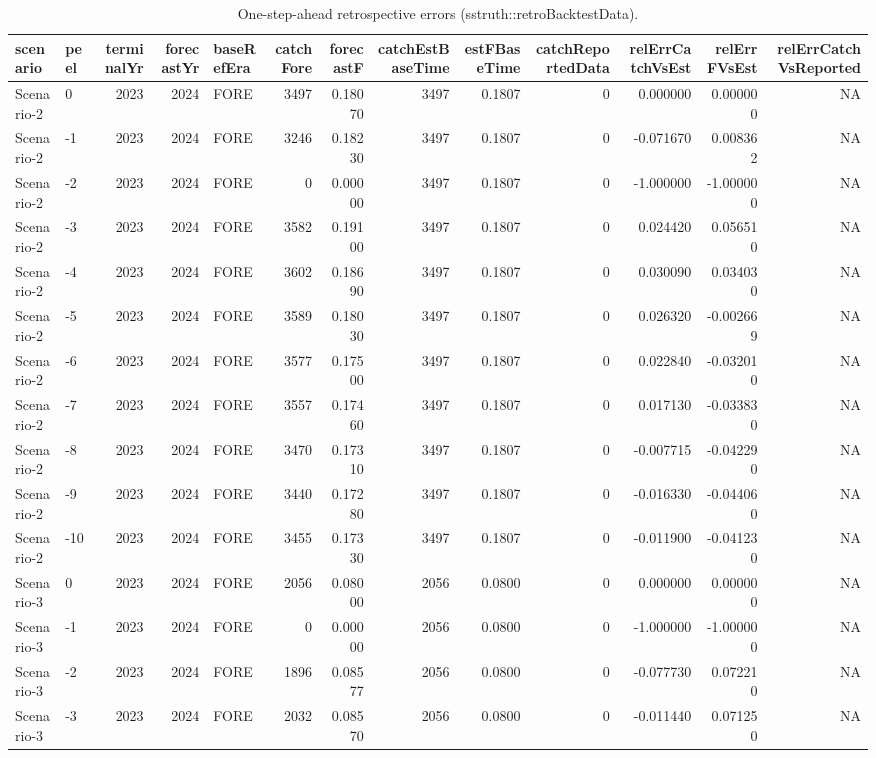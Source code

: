 \begin{table}

\caption{\label{tab:robustness-retro-onestep}One-step-ahead retrospective errors (sstruth::retroBacktestData).}
\centering
\begin{tabular}[t]{llrrlrrrrrrrr}
\toprule
scenario & peel & terminalYr & forecastYr & baseRefEra & catchFore & forecastF & catchEstBaseTime & estFBaseTime & catchReportedData & relErrCatchVsEst & relErrFVsEst & relErrCatchVsReported\\
\midrule
Scenario-2 & 0 & 2023 & 2024 & FORE & 3497 & 0.18070 & 3497 & 0.1807 & 0 & 0.000000 & 0.000000 & NA\\
Scenario-2 & -1 & 2023 & 2024 & FORE & 3246 & 0.18230 & 3497 & 0.1807 & 0 & -0.071670 & 0.008362 & NA\\
Scenario-2 & -2 & 2023 & 2024 & FORE & 0 & 0.00000 & 3497 & 0.1807 & 0 & -1.000000 & -1.000000 & NA\\
Scenario-2 & -3 & 2023 & 2024 & FORE & 3582 & 0.19100 & 3497 & 0.1807 & 0 & 0.024420 & 0.056510 & NA\\
Scenario-2 & -4 & 2023 & 2024 & FORE & 3602 & 0.18690 & 3497 & 0.1807 & 0 & 0.030090 & 0.034030 & NA\\
\addlinespace
Scenario-2 & -5 & 2023 & 2024 & FORE & 3589 & 0.18030 & 3497 & 0.1807 & 0 & 0.026320 & -0.002669 & NA\\
Scenario-2 & -6 & 2023 & 2024 & FORE & 3577 & 0.17500 & 3497 & 0.1807 & 0 & 0.022840 & -0.032010 & NA\\
Scenario-2 & -7 & 2023 & 2024 & FORE & 3557 & 0.17460 & 3497 & 0.1807 & 0 & 0.017130 & -0.033830 & NA\\
Scenario-2 & -8 & 2023 & 2024 & FORE & 3470 & 0.17310 & 3497 & 0.1807 & 0 & -0.007715 & -0.042290 & NA\\
Scenario-2 & -9 & 2023 & 2024 & FORE & 3440 & 0.17280 & 3497 & 0.1807 & 0 & -0.016330 & -0.044060 & NA\\
\addlinespace
Scenario-2 & -10 & 2023 & 2024 & FORE & 3455 & 0.17330 & 3497 & 0.1807 & 0 & -0.011900 & -0.041230 & NA\\
Scenario-3 & 0 & 2023 & 2024 & FORE & 2056 & 0.08000 & 2056 & 0.0800 & 0 & 0.000000 & 0.000000 & NA\\
Scenario-3 & -1 & 2023 & 2024 & FORE & 0 & 0.00000 & 2056 & 0.0800 & 0 & -1.000000 & -1.000000 & NA\\
Scenario-3 & -2 & 2023 & 2024 & FORE & 1896 & 0.08577 & 2056 & 0.0800 & 0 & -0.077730 & 0.072210 & NA\\
Scenario-3 & -3 & 2023 & 2024 & FORE & 2032 & 0.08570 & 2056 & 0.0800 & 0 & -0.011440 & 0.071250 & NA\\

\end{tabular}
\end{table}
